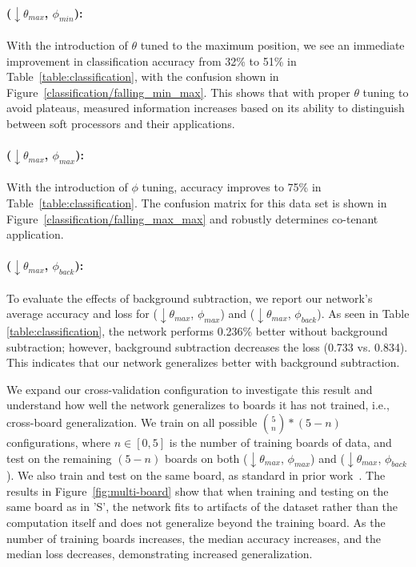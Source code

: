 \paragraph{\textbf{($\downarrow\theta_{max}$, $\phi_{min}$)}: } 
With the introduction of $\theta$ tuned to the maximum position, we see an immediate improvement in classification accuracy from 32\% to 51\% in Table~\ref{table:classification}, with the confusion shown in Figure~\ref{classification/falling_min_max}.
This shows that with proper $\theta$ tuning to avoid plateaus, measured information increases based on its ability to distinguish between soft processors and their applications. 
\paragraph{(\textbf{$\downarrow\theta_{max}$, $\phi_{max}$)}: }
With the introduction of $\phi$ tuning, accuracy improves to 75\% in Table~\ref{table:classification}. The confusion matrix for this data set is shown in Figure~\ref{classification/falling_max_max} and robustly determines co-tenant application. 
\paragraph{\textbf{($\downarrow\theta_{max}$, $\phi_{back}$)}: }
To evaluate the effects of background subtraction, we report our network's average accuracy and loss for ($\downarrow\theta_{max}$, $\phi_{max}$) and ($\downarrow\theta_{max}$, $\phi_{back}$). As seen in Table \ref{table:classification}, the network performs 0.236\% better without background subtraction; however, background subtraction decreases the loss (0.733 vs. 0.834).
This indicates that our network generalizes better with background subtraction.

We expand our cross-validation configuration to investigate this result and understand how well the network generalizes to boards it has not trained, i.e., cross-board generalization. We train on all possible $\binom{5}{n} * (5 - n)$ configurations, where $n \in [0,5]$ is the number of training boards of data, and test on the remaining $(5-n)$ boards on both ($\downarrow\theta_{max}$, $\phi_{max}$) and ($\downarrow\theta_{max}$, $\phi_{back}$). We also train and test on the same board, as standard in prior work~\cite{gobulukoglu2021dac}. The results in Figure~\ref{fig:multi-board} show that when training and testing on the same board as in 'S', the network fits to artifacts of the dataset rather than the computation itself and does not generalize beyond the training board.
As the number of training boards increases, the median accuracy increases, and the median loss decreases, demonstrating increased generalization. 

